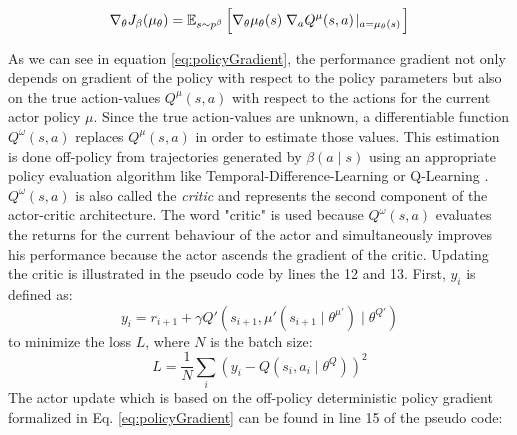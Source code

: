 \begin{equation}\label{eq:policyGradient}
    \nabla_\theta J_\beta (\mu_\theta) = 
    \operatorname{\mathbb{E}}_{s \sim p^\beta}
    \Big[ \nabla_\theta \mu_\theta(s) \; \nabla_a Q^\mu (s,a) \!\mid_{a = \mu_\theta (s)} \! \Big]
\end{equation}


As we can see in equation \ref{eq:policyGradient}, the performance gradient not only depends on gradient of the policy with respect to the policy parameters but also on the true action-values $Q^\mu(s,a)$ with respect to the actions for the current actor policy $\mu$. Since the true action-values are unknown, a differentiable function $Q^ \omega(s,a)$ replaces $Q^\mu(s,a)$ in order to estimate those values. This estimation is done off-policy from trajectories generated by $\beta(a\!\mid\!s)$ using an appropriate policy evaluation algorithm like Temporal-Difference-Learning or Q-Learning \cite[p.~5]{silver2014deterministic}. $Q^ \omega(s,a)$ is also called the \textit{critic} and represents the second component of the actor-critic architecture. The word "critic" is used because $Q^ \omega(s,a)$ evaluates the returns for the current behaviour of the actor and simultaneously improves his performance because the actor ascends the gradient of the critic. Updating the critic is illustrated in the pseudo code by lines the 12 and 13. First, $y_i$ is defined as:
\begin{equation*}
    y_i = r_{i+1} + \gamma Q' (s_{i+1}, \mu'(s_{i+1} \mid \theta^{\mu'})  \mid \theta^{Q'})
\end{equation*}
to minimize the loss $L$, where $N$ is the batch size:
\begin{equation*}
    L = \frac{1}{N} \sum_i{(y_i - Q(s_i, a_i \mid \theta^Q))^2}
\end{equation*}
The actor update which is based on the off-policy deterministic policy gradient formalized in Eq. \ref{eq:policyGradient} can be found in line 15 of the pseudo code:

